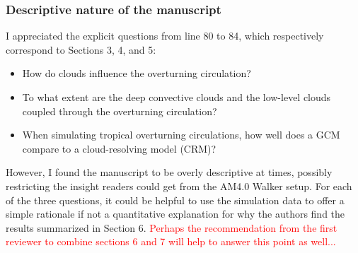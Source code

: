 \documentclass[draft]{agujournal2019}
\begin{document}
\subsubsection{Descriptive nature of the manuscript}

I appreciated the explicit questions from line 80 to 84, which respectively correspond to Sections 3, 4, and 5:

\begin{itemize}
  \item How do clouds influence the overturning circulation?
  \item To what extent are the deep convective clouds and the low-level clouds coupled through the overturning circulation?
  \item When simulating tropical overturning circulations, how well does a GCM compare to a cloud-resolving model (CRM)?
\end{itemize}

However, I found the manuscript to be overly descriptive at times, possibly restricting the insight readers could get from
the AM4.0 Walker setup. For each of the three questions, it could be helpful to use the simulation data to offer a simple
rationale if not a quantitative explanation for why the authors find the results summarized in Section 6.  
\textcolor{red}{Perhaps the recommendation from the first reviewer to combine sections 6 and 7 will help to answer this point as well...}
\end{document}
